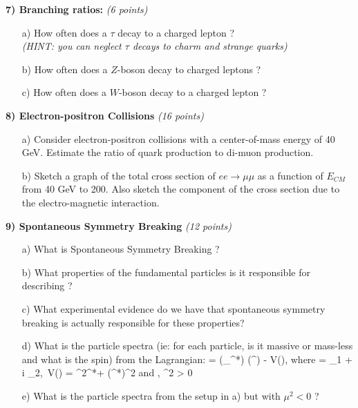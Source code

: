 {\textbf{7) Branching ratios:  } \hfill \textit{(6 points)}\\
\begin{itemize}
\item[a)]{How often does a $\tau$ decay to a charged lepton ? \\ \textit{(HINT: you can neglect $\tau$ decays to charm and strange quarks) }  
\vspace*{2.0in}
}
\item[b)]{How often does a $Z$-boson decay to charged leptons ?
\vspace*{2.0in}
}
\item[c)]{How often does a $W$-boson decay to a charged lepton ?
\vspace*{2.0in}
}
\end{itemize}


\clearpage

\textbf{8) Electron-positron Collisions } \hfill \textit{(16 points)}\\
\begin{itemize}
\item[a)]{Consider electron-positron collisions with a center-of-mass  energy of 40 GeV.
Estimate the ratio of quark production to di-muon production. 
\vspace*{4.5in}
}
\item[b)]{Sketch a graph of the total cross section of $ee\rightarrow\mu\mu$ as a function of $E_{CM}$ from 40 GeV to 200. 
Also sketch the component of the cross section due to the electro-magnetic interaction.
\vspace*{0.5in}
}
\end{itemize}



\clearpage

\textbf{9) Spontaneous Symmetry Breaking} \hfill \textit{(12 points)} \\ 
\begin{itemize}
\item[a)]{What is Spontaneous Symmetry Breaking  ?  }
\vspace*{1.5in}
\item[b)]{What properties of the fundamental particles is it responsible for describing ?}
\vspace*{1.0in}
\item[c)]{What experimental evidence do we have that spontaneous symmetry breaking is actually responsible for these properties?}
\vspace*{1.0in}
\item[d)]{ What is the particle spectra (ie: for each particle, is it massive or mass-less and what is the spin) from the Lagrangian: \be{} = (\partial_\mu \phi^*) (\partial^\mu \phi) - V(\phi), \textrm{ where } \phi = \phi_1 + i \phi_2,\  V(\phi) = \mu^2\phi^*\phi + \lambda (\phi^*\phi)^2\textrm { and } \lambda, \mu^2 > 0   \ee
\vspace{1.0in}
}
\item[e)]{ What is the particle spectra from the setup in a) but with $\mu^2 < 0$ ?
\vspace{1.0in}
}
\end{itemize}

}
